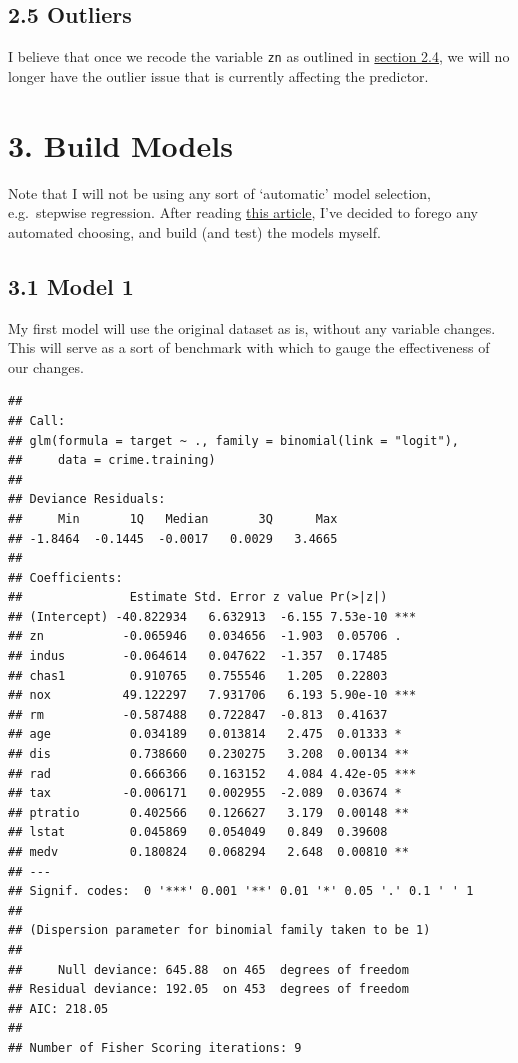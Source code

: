 \documentclass[]{article}
\begin{document}
\subsection{2.5 Outliers}\label{outliers}

I believe that once we recode the variable \texttt{zn} as outlined in
\protect\hyperlink{variable-transformation}{section 2.4}, we will no
longer have the outlier issue that is currently affecting the predictor.

\section{3. Build Models}\label{build-models}

Note that I will not be using any sort of `automatic' model selection,
e.g.~stepwise regression. After reading
\href{https://www.stata.com/support/faqs/statistics/stepwise-regression-problems/}{this
article}, I've decided to forego any automated choosing, and build (and
test) the models myself.

\subsection{3.1 Model 1}\label{model-1}

My first model will use the original dataset as is, without any variable
changes. This will serve as a sort of benchmark with which to gauge the
effectiveness of our changes.

\begin{verbatim}
## 
## Call:
## glm(formula = target ~ ., family = binomial(link = "logit"), 
##     data = crime.training)
## 
## Deviance Residuals: 
##     Min       1Q   Median       3Q      Max  
## -1.8464  -0.1445  -0.0017   0.0029   3.4665  
## 
## Coefficients:
##               Estimate Std. Error z value Pr(>|z|)    
## (Intercept) -40.822934   6.632913  -6.155 7.53e-10 ***
## zn           -0.065946   0.034656  -1.903  0.05706 .  
## indus        -0.064614   0.047622  -1.357  0.17485    
## chas1         0.910765   0.755546   1.205  0.22803    
## nox          49.122297   7.931706   6.193 5.90e-10 ***
## rm           -0.587488   0.722847  -0.813  0.41637    
## age           0.034189   0.013814   2.475  0.01333 *  
## dis           0.738660   0.230275   3.208  0.00134 ** 
## rad           0.666366   0.163152   4.084 4.42e-05 ***
## tax          -0.006171   0.002955  -2.089  0.03674 *  
## ptratio       0.402566   0.126627   3.179  0.00148 ** 
## lstat         0.045869   0.054049   0.849  0.39608    
## medv          0.180824   0.068294   2.648  0.00810 ** 
## ---
## Signif. codes:  0 '***' 0.001 '**' 0.01 '*' 0.05 '.' 0.1 ' ' 1
## 
## (Dispersion parameter for binomial family taken to be 1)
## 
##     Null deviance: 645.88  on 465  degrees of freedom
## Residual deviance: 192.05  on 453  degrees of freedom
## AIC: 218.05
## 
## Number of Fisher Scoring iterations: 9
\end{verbatim}
\end{document}

